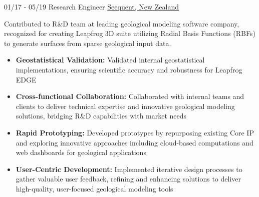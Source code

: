 \documentclass[]{friggeri-cv}
\begin{document}
\begin{entrylist}
 	\entry
    {01/17 - 05/19}
    {Research Engineer}
    {\href{https://www.seequent.com/}{Seequent, New Zealand}}
    {
	Contributed to R\&D team at leading geological modeling software company, recognized for creating Leapfrog 3D suite utilizing Radial Basis Functions (RBFs) to generate surfaces from sparse geological input data.
    \\[-0.5em]
   	\begin{itemize}[label={}, itemsep=3pt, leftmargin=0pt]
		\item \textbf{Geostatistical Validation:} Validated internal geostatistical implementations, ensuring scientific accuracy and robustness for Leapfrog EDGE
		\item \textbf{Cross-functional Collaboration:} Collaborated with internal teams and clients to deliver technical expertise and innovative geological modeling solutions, bridging R\&D capabilities with market needs
		\item \textbf{Rapid Prototyping:} Developed prototypes by repurposing existing Core IP and exploring innovative approaches including cloud-based computations and web dashboards for geological applications
		\item \textbf{User-Centric Development:} Implemented iterative design processes to gather valuable user feedback, refining and enhancing solutions to deliver high-quality, user-focused geological modeling tools
	\end{itemize}
	}
  

    

\end{entrylist}
\end{document}
